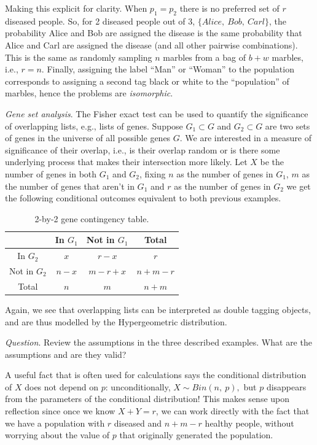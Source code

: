 Making this explicit for clarity. 
When \(p_{1} = p_{2}\) there is no preferred set of \(r\) diseased people. 
So, for 2 diseased people out of 3, \(\{Alice,\ Bob,\ Carl\}\), 
the probability Alice and Bob are assigned
the disease is the same probability that Alice and Carl are assigned the disease 
(and all other pairwise combinations). 
This is the same as randomly sampling \(n\) marbles from a bag of \(b + w\) marbles, i.e., \(r = n\). 
Finally, assigning the label ``Man'' or ``Woman'' to the population corresponds to 
assigning a second tag black or white to the ``population'' of marbles, 
hence the problems are \emph{isomorphic}.

\emph{Gene set analysis}. 
The Fisher exact test can be used to quantify the 
significance of overlapping lists, e.g., lists of genes. 
Suppose \(G_{1} \subset G\) and \(G_{2} \subset G\) are two sets of genes in the
universe of all possible genes \(G\). 
We are interested in a measure of significance of their overlap, 
i.e., is their overlap random or is there some underlying process that makes their intersection more likely. 
Let \(X\) be the number of genes in both \(G_{1}\) and \(G_{2}\), 
fixing \(n\) as the number of genes in \(G_{1}\), 
\(m\) as the number of genes that aren't in \(G_{1}\) and \(r\) as the number of genes in \(G_{2}\)
we get the following conditional outcomes equivalent to both previous examples.

\begin{table}[h!]
\centering
\begin{tabular}{| c | c | c | c |}
\hline
& In \(G_1\) & Not in \(G_1\) & Total \\\hline
In \(G_2\) & $x$ & $r-x$ & $r$ \\\hline
Not in \(G_2\) & $n-x$ & $m-r+x$ & $n+m-r$ \\\hline
Total & $n$ & $m$ & $n+m$ \\\hline
\end{tabular}
\caption{%
2-by-2 gene contingency table.
}
\end{table}

Again, we see that overlapping lists can be interpreted as double tagging objects, 
and are thus modelled by the Hypergeometric distribution.

\emph{Question}. 
Review the assumptions in the three described examples.
What are the assumptions and are they valid?

A useful fact that is often used for calculations says the 
conditional distribution of \(X\) does not depend on \(p\): unconditionally, 
\(X \sim Bin(n,\ p),\) but \(p\) disappears from the parameters of the conditional distribution! 
This makes sense upon reflection since once we know \(X + Y = r\), 
we can work directly with the fact that we have a population with \(r\) diseased and \(n + m - r\) healthy people, 
without worrying about the value of \(p\) that originally generated the population.

